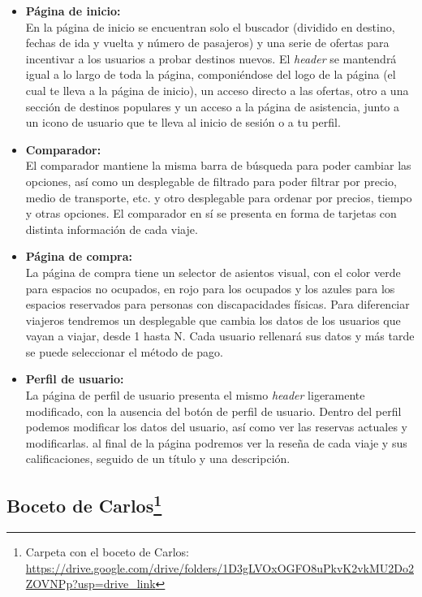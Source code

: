 \begin{itemize}
    \item\textbf{Página de inicio:} \\ En la página de inicio se encuentran solo el buscador (dividido en destino, fechas de ida y vuelta y número de pasajeros) y una serie de ofertas para incentivar a los usuarios a probar destinos nuevos. El \textit{header} se mantendrá igual a lo largo de toda la página, componiéndose del logo de la página (el cual te lleva a la página de inicio), un acceso directo a las ofertas, otro a una sección de destinos populares y un acceso a la página de asistencia, junto a un icono de usuario que te lleva al inicio de sesión o a tu perfil. 
    \item\textbf{Comparador:} \\ El comparador mantiene la misma barra de búsqueda para poder cambiar las opciones, así como un desplegable de filtrado para poder filtrar por precio, medio de transporte, etc. y otro desplegable para ordenar por precios, tiempo y otras opciones. El comparador en sí se presenta en forma de tarjetas con distinta información de cada viaje.
    \item\textbf{Página de compra:} \\ La página de compra tiene un selector de asientos visual, con el color verde para espacios no ocupados, en rojo para los ocupados y los azules para los espacios reservados para personas con discapacidades físicas. Para diferenciar viajeros tendremos un desplegable que cambia los datos de los usuarios que vayan a viajar, desde 1 hasta N. Cada usuario rellenará sus datos y más tarde se puede seleccionar el método de pago.
    \item\textbf{Perfil de usuario:} \\ La página de perfil de usuario presenta el mismo \textit{header} ligeramente modificado, con la ausencia del botón de perfil de usuario. Dentro del perfil podemos modificar los datos del usuario, así como ver las reservas actuales y modificarlas. al final de la página podremos ver la reseña de cada viaje y sus calificaciones, seguido de un título y una descripción.
\end{itemize}



\subsection[Boceto de Carlos]{Boceto de Carlos\footnote{Carpeta con el boceto de Carlos: \url{https://drive.google.com/drive/folders/1D3gLVOxOGFO8uPkvK2vkMU2Do2ZOVNPp?usp=drive_link}}}

